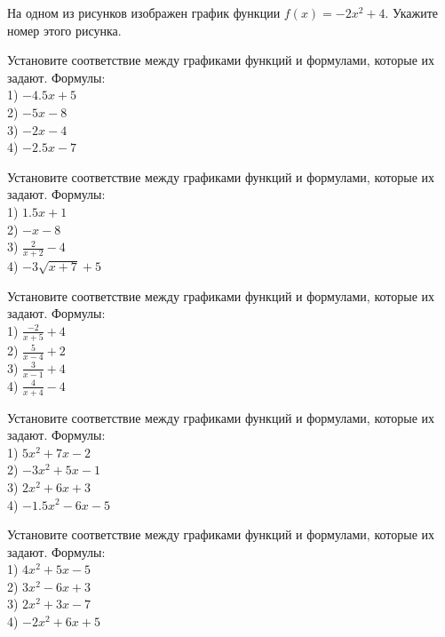 \documentclass[4apaper]{article}
\begin{document}
\begin{taskBN}{75}
На одном из рисунков изображен график функции $f(x)=-2x^2+4$. Укажите номер этого рисунка.
\end{taskBN}

\begin{taskBN}{76}
Установите соответствие между графиками функций и формулами, которые их задают. Формулы: \\1) $-4.5x+5$\\2) $-5x-8$\\3) $-2x-4$\\4) $-2.5x-7$
\end{taskBN}

\begin{taskBN}{77}
Установите соответствие между графиками функций и формулами, которые их задают. Формулы: \\1) $1.5x+1$\\2) $-x-8$\\3) $\frac{2}{x+2}-4$\\4) $-3\sqrt{x+7}+5$
\end{taskBN}

\begin{taskBN}{78}
Установите соответствие между графиками функций и формулами, которые их задают. Формулы: \\1) $\frac{-2}{x+5}+4$\\2) $\frac{5}{x-4}+2$\\3) $\frac{3}{x-1}+4$\\4) $\frac{4}{x+4}-4$
\end{taskBN}

\begin{taskBN}{79}
Установите соответствие между графиками функций и формулами, которые их задают. Формулы: \\1) $5x^2+7x-2$\\2) $-3x^2+5x-1$\\3) $2x^2+6x+3$\\4) $-1.5x^2-6x-5$
\end{taskBN}

\begin{taskBN}{80}
Установите соответствие между графиками функций и формулами, которые их задают. Формулы: \\1) $4x^2+5x-5$\\2) $3x^2-6x+3$\\3) $2x^2+3x-7$\\4) $-2x^2+6x+5$
\end{taskBN}
\end{document}
